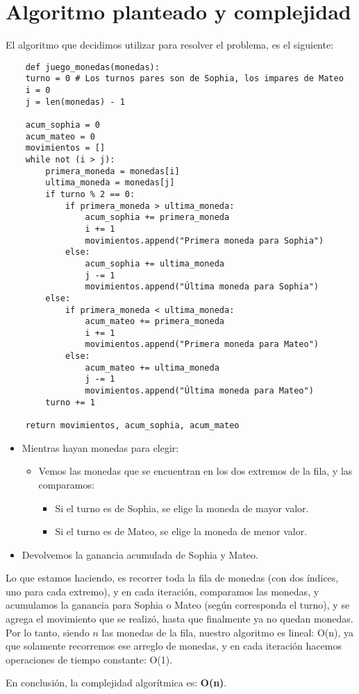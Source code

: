 \section{Algoritmo planteado y complejidad}

El algoritmo que decidimos utilizar para resolver el problema, es el siguiente:

\begin{verbatim}
    def juego_monedas(monedas):
    turno = 0 # Los turnos pares son de Sophia, los impares de Mateo
    i = 0
    j = len(monedas) - 1

    acum_sophia = 0
    acum_mateo = 0
    movimientos = []
    while not (i > j):
        primera_moneda = monedas[i]
        ultima_moneda = monedas[j]
        if turno % 2 == 0:
            if primera_moneda > ultima_moneda:
                acum_sophia += primera_moneda
                i += 1
                movimientos.append("Primera moneda para Sophia")
            else:
                acum_sophia += ultima_moneda
                j -= 1
                movimientos.append("Última moneda para Sophia")
        else:
            if primera_moneda < ultima_moneda:
                acum_mateo += primera_moneda
                i += 1
                movimientos.append("Primera moneda para Mateo")
            else:
                acum_mateo += ultima_moneda
                j -= 1
                movimientos.append("Última moneda para Mateo")
        turno += 1

    return movimientos, acum_sophia, acum_mateo
\end{verbatim}

\begin {itemize}
\item Mientras hayan monedas para elegir:
    \begin {itemize}
    \item Vemos las monedas que se encuentran en los dos extremos de la fila, y las comparamos:
        \begin {itemize}
        \item Si el turno es de Sophia, se elige la moneda de mayor valor.
        \item Si el turno es de Mateo, se elige la moneda de menor valor.
        \end {itemize}
    \end {itemize}
\item Devolvemos la ganancia acumulada de Sophia y Mateo.
\end {itemize}

Lo que estamos haciendo, es recorrer toda la fila de monedas (con dos índices, uno para cada extremo), y en cada iteración, comparamos las monedas, y acumulamos la ganancia para Sophia o Mateo (según corresponda el turno), y se agrega el movimiento que se realizó, hasta que finalmente ya no quedan monedas. Por lo tanto, siendo $n$ las monedas de la fila, nuestro algoritmo es lineal: O(n), ya que solamente recorremos ese arreglo de monedas, y en cada iteración hacemos operaciones de tiempo constante: O(1).

En conclusión, la complejidad algorítmica es: \textbf{O(n)}.